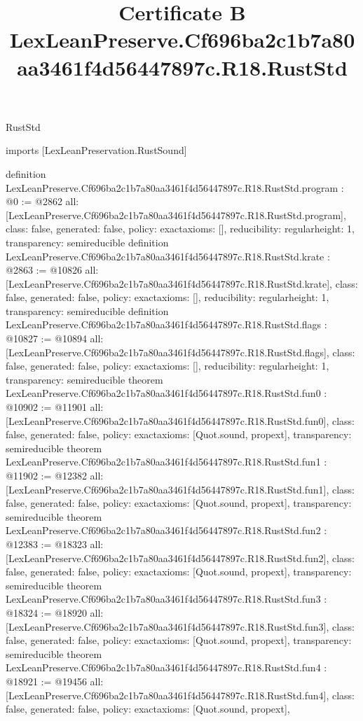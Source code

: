 \begin{lexlean}{RustStd}
\title{Certificate B LexLeanPreserve.Cf696ba2c1b7a80aa3461f4d56447897c.R18.RustStd}
\begin{coremodule}
imports [LexLeanPreservation.RustSound]

definition LexLeanPreserve.Cf696ba2c1b7a80aa3461f4d56447897c.R18.RustStd.program : @0 := @2862 {
  all: [LexLeanPreserve.Cf696ba2c1b7a80aa3461f4d56447897c.R18.RustStd.program],
  class: false,
  generated: false,
  policy: exact{axioms: []},
  reducibility: regular{height: 1},
  transparency: semireducible
}
definition LexLeanPreserve.Cf696ba2c1b7a80aa3461f4d56447897c.R18.RustStd.krate : @2863 := @10826 {
  all: [LexLeanPreserve.Cf696ba2c1b7a80aa3461f4d56447897c.R18.RustStd.krate],
  class: false,
  generated: false,
  policy: exact{axioms: []},
  reducibility: regular{height: 1},
  transparency: semireducible
}
definition LexLeanPreserve.Cf696ba2c1b7a80aa3461f4d56447897c.R18.RustStd.flags : @10827 := @10894 {
  all: [LexLeanPreserve.Cf696ba2c1b7a80aa3461f4d56447897c.R18.RustStd.flags],
  class: false,
  generated: false,
  policy: exact{axioms: []},
  reducibility: regular{height: 1},
  transparency: semireducible
}
theorem LexLeanPreserve.Cf696ba2c1b7a80aa3461f4d56447897c.R18.RustStd.fun0 : @10902 := @11901 {
  all: [LexLeanPreserve.Cf696ba2c1b7a80aa3461f4d56447897c.R18.RustStd.fun0],
  class: false,
  generated: false,
  policy: exact{axioms: [Quot.sound, propext]},
  transparency: semireducible
}
theorem LexLeanPreserve.Cf696ba2c1b7a80aa3461f4d56447897c.R18.RustStd.fun1 : @11902 := @12382 {
  all: [LexLeanPreserve.Cf696ba2c1b7a80aa3461f4d56447897c.R18.RustStd.fun1],
  class: false,
  generated: false,
  policy: exact{axioms: [Quot.sound, propext]},
  transparency: semireducible
}
theorem LexLeanPreserve.Cf696ba2c1b7a80aa3461f4d56447897c.R18.RustStd.fun2 : @12383 := @18323 {
  all: [LexLeanPreserve.Cf696ba2c1b7a80aa3461f4d56447897c.R18.RustStd.fun2],
  class: false,
  generated: false,
  policy: exact{axioms: [Quot.sound, propext]},
  transparency: semireducible
}
theorem LexLeanPreserve.Cf696ba2c1b7a80aa3461f4d56447897c.R18.RustStd.fun3 : @18324 := @18920 {
  all: [LexLeanPreserve.Cf696ba2c1b7a80aa3461f4d56447897c.R18.RustStd.fun3],
  class: false,
  generated: false,
  policy: exact{axioms: [Quot.sound, propext]},
  transparency: semireducible
}
theorem LexLeanPreserve.Cf696ba2c1b7a80aa3461f4d56447897c.R18.RustStd.fun4 : @18921 := @19456 {
  all: [LexLeanPreserve.Cf696ba2c1b7a80aa3461f4d56447897c.R18.RustStd.fun4],
  class: false,
  generated: false,
  policy: exact{axioms: [Quot.sound, propext]},
}
\end{coremodule}
\end{lexlean}
